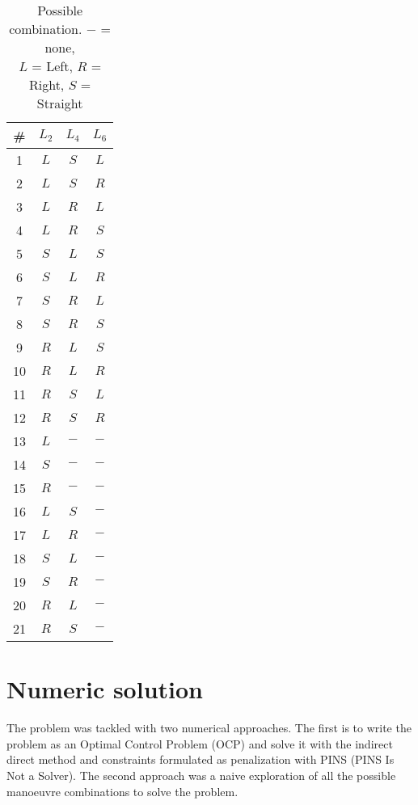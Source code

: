 \documentclass[11pt,twocolumn]{scrartcl}
\begin{document}
%
\begin{table}[ht]
  \centering
  \caption{Possible combination. $-$ = none,\\ $L$ = Left, $R$ = Right, $S$ = Straight}
  \label{tab:possiblecombination}
  \begin{tabular}{c|c|c|c}
  \hline
  \textbf{\#} & \textbf{$L_2$} & \textbf{$L_4$} & \textbf{$L_6$} \\
  \hline
  1 & $L$ & $S$ & $L$  \\
  2 & $L$ & $S$ & $R$  \\
  3 & $L$ & $R$ & $L$  \\
  4 & $L$ & $R$ & $S$  \\
  5 & $S$ & $L$ & $S$  \\
  6 & $S$ & $L$ & $R$  \\
  7 & $S$ & $R$ & $L$  \\
  8 & $S$ & $R$ & $S$  \\
  9 & $R$ & $L$ & $S$  \\
  10 & $R$ & $L$ & $R$  \\
  11 & $R$ & $S$ & $L$  \\
  12 & $R$ & $S$ & $R$  \\
  13 & $L$ & $-$ & $-$  \\
  14 & $S$ & $-$ & $-$  \\
  15 & $R$ & $-$ & $-$  \\
  16 & $L$ & $S$ & $-$  \\
  17 & $L$ & $R$ & $-$  \\
  18 & $S$ & $L$ & $-$  \\
  19 & $S$ & $R$ & $-$  \\
  20 & $R$ & $L$ & $-$  \\
  21 & $R$ & $S$ & $-$  \\
  \hline
  \end{tabular}
\end{table}
%
\section*{Numeric solution}
%
The problem was tackled with two numerical approaches. The first is to write the problem as an Optimal Control Problem (OCP) and solve it with the indirect direct method and constraints formulated as penalization with PINS (PINS Is Not a Solver)\cite{biral2016notes}. The second approach was a naive exploration of all the possible manoeuvre combinations to solve the problem.
%
\end{document}

